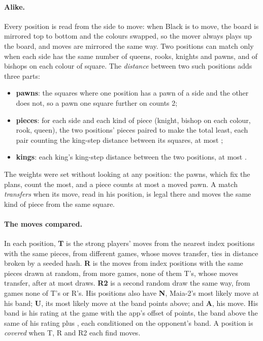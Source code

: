 \documentclass[11pt]{article}
\begin{document}
\paragraph{Alike.} Every position is read from the side to move: when Black is to move, the board
is mirrored top to bottom and the colours swapped, so the mover always plays up the board, and
moves are mirrored the same way. Two positions can match only when each side has the same number
of queens, rooks, knights and pawns, and of bishops on each colour of square. The
\emph{distance} between two such positions adds three parts:
\begin{itemize}[nosep]
\item \textbf{pawns}: the squares where one position has a pawn of a side and the other does not,
  so a pawn one square further on counts 2;
\item \textbf{pieces}: for each side and each kind of piece (knight, bishop on each colour, rook,
  queen), the two positions' pieces paired to make the total least, each pair counting the
  king-step distance between its squares, at most \PieceCap;
\item \textbf{kings}: each king's king-step distance between the two positions, at most \KingCap.
\end{itemize}
The weights were set without looking at any position: the pawns, which fix the plans, count the
most, and a piece counts at most a moved pawn. A match \emph{transfers} when its move, read in his
position, is legal there and moves the same kind of piece from the same square.

\paragraph{The moves compared.} In each position, \textbf{T} is the strong players' moves from
the \Arm{} nearest index positions with the same pieces, from \Arm{} different games, whose moves
transfer, ties in distance broken by a seeded hash. \textbf{R} is the moves from \Arm{} index
positions with the same pieces drawn at random, from \Arm{} more games, none of them T's, whose
moves transfer, after at most \RandomDraws{} draws. \textbf{R2} is a second random draw the same
way, from games none of T's or R's. His positions also have \textbf{N}, Maia-2's most likely move
at his band; \textbf{U}, its most likely move at the band \Above{} points above; and \textbf{A},
his move. His band is his rating at the game with the app's offset of \Offset{} points, the band
above the same of his rating plus \Above, each conditioned on the opponent's band. A position is
\emph{covered} when T, R and R2 each find \Arm{} moves.
\end{document}
